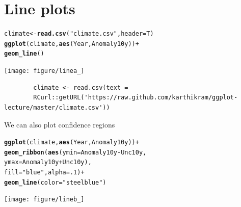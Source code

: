\documentclass{beamer}\usepackage[]{graphicx}\usepackage[]{color}
\makeatletter
\newcommand{\hlstr}[1]{\textcolor[rgb]{0.192,0.494,0.8}{#1}}%
\newcommand{\hlkwd}[1]{\textcolor[rgb]{0.737,0.353,0.396}{\textbf{#1}}}%
\newenvironment{kframe}{%
 \def\at@end@of@kframe{}%
 \ifinner\ifhmode%
  \def\at@end@of@kframe{\end{minipage}}%
  \begin{minipage}{\columnwidth}%
 \fi\fi%
 \def\FrameCommand##1{\hskip\@totalleftmargin \hskip-\fboxsep
 \colorbox{shadecolor}{##1}\hskip-\fboxsep
     \hskip-\linewidth \hskip-\@totalleftmargin \hskip\columnwidth}%
 \MakeFramed {\advance\hsize-\width
   \@totalleftmargin\z@ \linewidth\hsize
   \@setminipage}}%
 {\par\unskip\endMakeFramed%
 \at@end@of@kframe}
\newenvironment{knitrout}{}{} %
\makeatother
\begin{document}

\section*{Line plots}
\frame{\sectionpage}


\begin{frame}[fragile]


\begin{knitrout}\footnotesize
{}\color{fgcolor}\begin{kframe}
\begin{alltt}
climate <- \hlkwd{read.csv}(\hlstr{"climate.csv"}, header = T)
\hlkwd{ggplot}(climate, \hlkwd{aes}(Year, Anomaly10y)) +
\hlkwd{geom_line}()
\end{alltt}
\end{kframe}

{\centering \texttt{[image: figure/linea\_]} 

}



\end{knitrout}

\begin{flushright}
\begingroup
    \fontsize{6pt}{12pt}\selectfont
    \begin{verbatim}
        climate <- read.csv(text =
        RCurl::getURL('https://raw.github.com/karthikram/ggplot-lecture/master/climate.csv'))
    \end{verbatim}
\endgroup
\end{flushright}
\end{frame}


\begin{frame}[fragile]
We can also plot confidence regions
\begin{knitrout}\footnotesize
{}\color{fgcolor}\begin{kframe}
\begin{alltt}
\hlkwd{ggplot}(climate, \hlkwd{aes}(Year, Anomaly10y)) +
\hlkwd{geom_ribbon}(\hlkwd{aes}(ymin = Anomaly10y - Unc10y,
ymax = Anomaly10y + Unc10y),
fill = \hlstr{"blue"}, alpha = .1) +
\hlkwd{geom_line}(color = \hlstr{"steelblue"})
\end{alltt}
\end{kframe}

{\centering \texttt{[image: figure/lineb\_]} 

}



\end{knitrout}

\end{frame}
\end{document}
